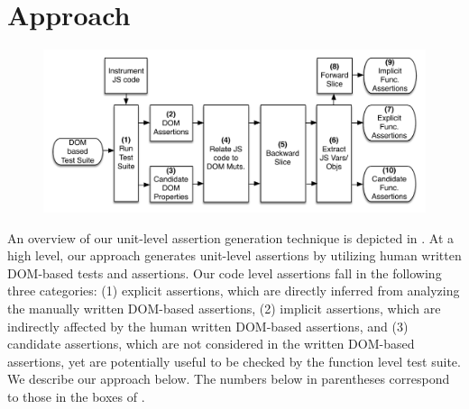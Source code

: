 \section{Approach} \label{Sec:approach}
\begin{figure}[!t]
  \centering
  \includegraphics[width=1\hsize]{fig/approachDiagram}
  \vspace{-0.3in} 
  \label{Fig:approachDiagram}
  \vspace{-0.2in} 
\end{figure}

An overview of our unit-level assertion generation technique is depicted in .
At a high level, our approach generates unit-level assertions by utilizing human written DOM-based tests and assertions. Our code level assertions fall in the following three categories: (1) explicit assertions, which are directly inferred from analyzing the manually written DOM-based assertions, (2) implicit assertions, which are indirectly affected by the human written DOM-based assertions, and (3) candidate assertions, which are not considered in the written DOM-based assertions, yet are potentially useful to be checked by the function level test suite. We describe our approach below. The numbers below in parentheses correspond to those in the boxes of .

